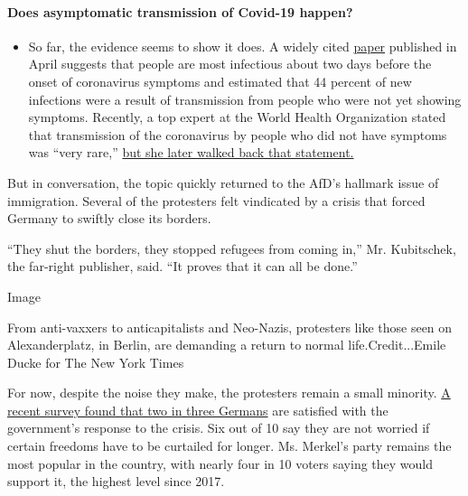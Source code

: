 \begin{itemize}
{  \paragraph{Does asymptomatic transmission of Covid-19
  happen?}\label{does-asymptomatic-transmission-of-covid-19-happen}}

  \begin{itemize}
  \tightlist
  \item
    So far, the evidence seems to show it does. A widely cited
    \href{https://www.nature.com/articles/s41591-020-0869-5}{paper}
    published in April suggests that people are most infectious about
    two days before the onset of coronavirus symptoms and estimated that
    44 percent of new infections were a result of transmission from
    people who were not yet showing symptoms. Recently, a top expert at
    the World Health Organization stated that transmission of the
    coronavirus by people who did not have symptoms was ``very rare,''
    \href{https://www.nytimes.com/2020/06/09/world/coronavirus-updates.html?action=click\&pgtype=Article\&state=default\&region=MAIN_CONTENT_3\&context=storylines_faq\#link-1f302e21}{but
    she later walked back that statement.}
  \end{itemize}
\end{itemize}

But in conversation, the topic quickly returned to the AfD's hallmark
issue of immigration. Several of the protesters felt vindicated by a
crisis that forced Germany to swiftly close its borders.

``They shut the borders, they stopped refugees from coming in,'' Mr.
Kubitschek, the far-right publisher, said. ``It proves that it can all
be done.''

Image

From anti-vaxxers to anticapitalists and Neo-Nazis, protesters like
those seen on Alexanderplatz, in Berlin, are demanding a return to
normal life.Credit...Emile Ducke for The New York Times

For now, despite the noise they make, the protesters remain a small
minority.
\href{https://presse.wdr.de/plounge/tv/das_erste/2020/05/20200507_ard_deutschlandtrend_3.html}{A
recent survey found that two in three Germans} are satisfied with the
government's response to the crisis. Six out of 10 say they are not
worried if certain freedoms have to be curtailed for longer. Ms.
Merkel's party remains the most popular in the country, with nearly four
in 10 voters saying they would support it, the highest level since 2017.

